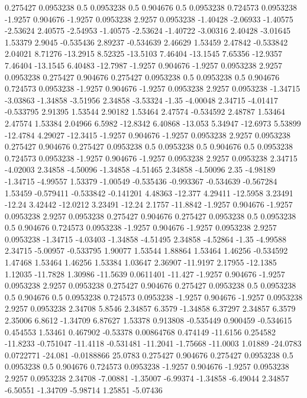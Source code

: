 0.275427 0.0953238
0.5 0.0953238
0.5 0.904676
0.5 0.0953238
0.724573 0.0953238
-1.9257 0.904676
-1.9257 0.0953238
2.9257 0.0953238
-1.40428 -2.06933
-1.40575 -2.53624
2.40575 -2.54953
-1.40575 -2.53624
-1.40722 -3.00316
2.40428 -3.01645
1.53379 2.9045
-0.535436 2.89237
-0.534639 2.46629
1.53459 2.47842
-0.533842 2.04021
8.71276 -13.2915
8.52325 -13.5103
7.46404 -13.1545
7.65356 -12.9357
7.46404 -13.1545
6.40483 -12.7987
-1.9257 0.904676
-1.9257 0.0953238
2.9257 0.0953238
0.275427 0.904676
0.275427 0.0953238
0.5 0.0953238
0.5 0.904676
0.724573 0.0953238
-1.9257 0.904676
-1.9257 0.0953238
2.9257 0.0953238
-1.34715 -3.03863
-1.34858 -3.51956
2.34858 -3.53324
-1.35 -4.00048
2.34715 -4.01417
-0.533795 2.91395
1.53544 2.90182
1.53464 2.47574
-0.534592 2.48787
1.53464 2.47574
1.53384 2.04966
6.5982 -12.8342
6.40868 -13.053
5.34947 -12.6973
5.53899 -12.4784
4.29027 -12.3415
-1.9257 0.904676
-1.9257 0.0953238
2.9257 0.0953238
0.275427 0.904676
0.275427 0.0953238
0.5 0.0953238
0.5 0.904676
0.5 0.0953238
0.724573 0.0953238
-1.9257 0.904676
-1.9257 0.0953238
2.9257 0.0953238
2.34715 -4.02003
2.34858 -4.50096
-1.34858 -4.51465
2.34858 -4.50096
2.35 -4.98189
-1.34715 -4.99557
1.53379 -1.00549
-0.535436 -0.993367
-0.534639 -0.567284
1.53459 -0.579411
-0.533842 -0.141201
4.48363 -12.377
4.29411 -12.5958
3.23491 -12.24
3.42442 -12.0212
3.23491 -12.24
2.1757 -11.8842
-1.9257 0.904676
-1.9257 0.0953238
2.9257 0.0953238
0.275427 0.904676
0.275427 0.0953238
0.5 0.0953238
0.5 0.904676
0.724573 0.0953238
-1.9257 0.904676
-1.9257 0.0953238
2.9257 0.0953238
-1.34715 -4.03403
-1.34858 -4.51495
2.34858 -4.52864
-1.35 -4.99588
2.34715 -5.00957
-0.533795 1.90077
1.53544 1.88864
1.53464 1.46256
-0.534592 1.47468
1.53464 1.46256
1.53384 1.03647
2.36907 -11.9197
2.17955 -12.1385
1.12035 -11.7828
1.30986 -11.5639
0.0611401 -11.427
-1.9257 0.904676
-1.9257 0.0953238
2.9257 0.0953238
0.275427 0.904676
0.275427 0.0953238
0.5 0.0953238
0.5 0.904676
0.5 0.0953238
0.724573 0.0953238
-1.9257 0.904676
-1.9257 0.0953238
2.9257 0.0953238
2.34708 5.8546
2.34857 6.3579
-1.34858 6.37297
2.34857 6.3579
2.35006 6.8612
-1.34709 6.87627
1.53378 0.913808
-0.535449 0.900459
-0.534615 0.454553
1.53461 0.467902
-0.53378 0.00864768
0.474149 -11.6156
0.254582 -11.8233
-0.751047 -11.4118
-0.531481 -11.2041
-1.75668 -11.0003
1.01889 -24.0783
0.0722771 -24.081
-0.0188866 25.0783
0.275427 0.904676
0.275427 0.0953238
0.5 0.0953238
0.5 0.904676
0.724573 0.0953238
-1.9257 0.904676
-1.9257 0.0953238
2.9257 0.0953238
2.34708 -7.00881
-1.35007 -6.99374
-1.34858 -6.49044
2.34857 -6.50551
-1.34709 -5.98714
1.25851 -5.07436
